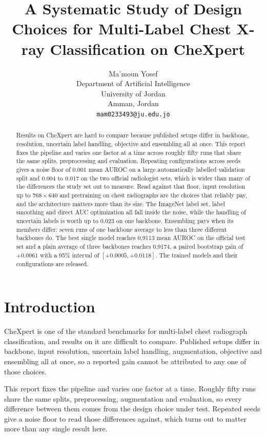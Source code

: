 \documentclass{article}
\title{A Systematic Study of Design Choices for Multi-Label Chest X-ray
Classification on CheXpert}
\author{
 Ma'moun Yosef \\
  Department of Artificial Intelligence\\
  University of Jordan\\
  Amman, Jordan \\
  \texttt{mam0233493@ju.edu.jo} \\
}
\begin{document}
\maketitle

\begin{abstract}
  Results on CheXpert are hard to compare because published setups differ in backbone,
  resolution, uncertain label handling, objective and ensembling all at once. This report
  fixes the pipeline and varies one factor at a time across roughly fifty runs that share
  the same splits, preprocessing and evaluation. Repeating configurations across seeds
  gives a noise floor of 0.001 mean AUROC on a large automatically labelled validation
  split and 0.004 to 0.017 on the two official radiologist sets, which is wider than many
  of the differences the study set out to measure. Read against that floor, input
  resolution up to $768\times640$ and pretraining on chest radiographs are the choices
  that reliably pay, and the architecture matters more than its size. The ImageNet label
  set, label smoothing and direct AUC optimization all fall inside the noise, while the
  handling of uncertain labels is worth up to 0.023 on one backbone. Ensembling pays when
  its members differ: seven runs of one backbone average to less than three different
  backbones do. The best single model reaches 0.9113 mean AUROC on the official test set
  and a plain average of three backbones reaches 0.9174, a paired bootstrap gain of
  $+0.0061$ with a 95\% interval of $[+0.0005, +0.0118]$. The trained models and their
  configurations are released.
\end{abstract}




\section{Introduction}

CheXpert \cite{irvin2019chexpert} is one of the standard benchmarks for multi-label
chest radiograph classification, and results on it are difficult to compare. Published
setups differ in backbone, input resolution, uncertain label handling, augmentation,
objective and ensembling all at once, so a reported gain cannot be attributed to any
one of those choices.

This report fixes the pipeline and varies one factor at a time. Roughly fifty runs share
the same splits, preprocessing, augmentation and evaluation, so every difference between
them comes from the design choice under test. Repeated seeds give a noise floor to read
those differences against, which turns out to matter more than any single result here.
\end{document}
